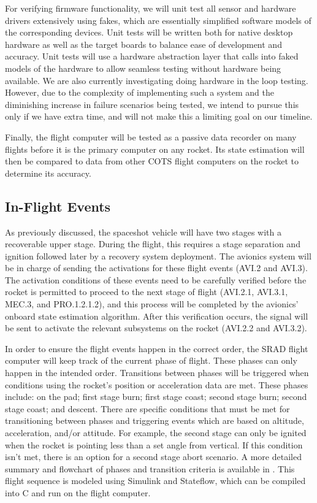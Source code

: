 For verifying firmware functionality, we will unit test all sensor and hardware drivers extensively using fakes, which are essentially simplified software models of the corresponding devices. Unit tests will be written both for native desktop hardware as well as the target boards to balance ease of development and accuracy. Unit tests will use a hardware abstraction layer that calls into faked models of the hardware to allow seamless testing without hardware being available. We are also currently investigating doing hardware in the loop testing. However, due to the complexity of implementing such a system and the diminishing increase in failure scenarios being tested, we intend to pursue this only if we have extra time, and will not make this a limiting goal on our timeline.

Finally, the flight computer will be tested as a passive data recorder on many flights before it is the primary computer on any rocket. Its state estimation will then be compared to data from other COTS flight computers on the rocket to determine its accuracy.


\subsection{In-Flight Events} %
As previously discussed, the spaceshot vehicle will have two stages with a recoverable upper stage. During the flight, this requires a stage separation and ignition followed later by a recovery system deployment. The avionics system will be in charge of sending the activations for these flight events (AVI.2 and AVI.3). The activation conditions of these events need to be carefully verified before the rocket is permitted to proceed to the next stage of flight (AVI.2.1, AVI.3.1, MEC.3, and PRO.1.2.1.2), and this process will be completed by the avionics' onboard state estimation algorithm. After this verification occurs, the signal will be sent to activate the relevant subsystems on the rocket (AVI.2.2 and AVI.3.2).

In order to ensure the flight events happen in the correct order, the SRAD flight computer will keep track of the current phase of flight. These phases can only happen in the intended order. Transitions between phases will be triggered when conditions using the rocket's position or acceleration data are met. These phases include: on the pad; first stage burn; first stage coast; second stage burn; second stage coast; and descent. There are specific conditions that must be met for transitioning between phases and triggering events which are based on altitude, acceleration, and/or attitude. For example, the second stage can only be ignited when the rocket is pointing less than a set angle from vertical. If this condition isn't met, there is an option for a second stage abort scenario. A more detailed summary and flowchart of phases and transition criteria is available in . This flight sequence is modeled using Simulink and Stateflow, which can be compiled into C and run on the flight computer.



